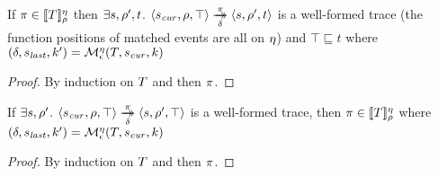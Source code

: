 \begin{lemma}[Soundness]
  If $\pi \in [\![ T ]\!]^{\eta}_{\rho}$ then $\exists s, \rho', t$.
%
  $\langle s_\mathit{cur}, \rho, \top \rangle \overset{\pi}{\underset{\delta}{\to\!\!\!\!\!\to}} \langle s, \rho', t \rangle$ is a well-formed trace (the function positions of matched events are all on $\eta$) and $\top \sqsubseteq t$
%
  where $(\delta, s_\mathit{last}, k') = {\mathcal M}_\epsilon^\eta(T, s_\mathit{cur}, k)$
\end{lemma}
\begin{proof}
  By induction on $T$ and then $\pi$.
\end{proof}
%
\begin{lemma}
  If $\exists s, \rho'$.
%
  $\langle s_\mathit{cur}, \rho, \top \rangle \overset{\pi}{\underset{\delta}{\to\!\!\!\!\!\to}} \langle s, \rho', \top \rangle$ is a well-formed trace,
  then $\pi \in [\![ T ]\!]^{\eta}_{\rho}$
%
  where $(\delta, s_\mathit{last}, k') = {\mathcal M}_\epsilon^\eta(T, s_\mathit{cur}, k)$
\end{lemma}
\begin{proof}
  By induction on $T$ and then $\pi$.
\end{proof}
%


